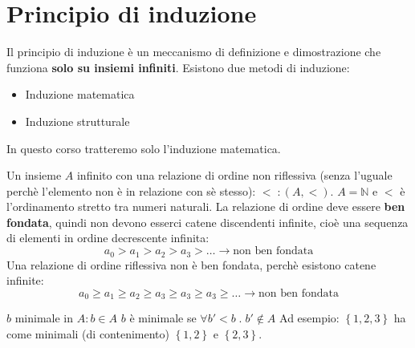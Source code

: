 \documentclass[a4paper]{article}
\begin{document}
\section{Principio di induzione}
Il principio di induzione è un meccanismo di definizione e dimostrazione che funziona
\textbf{solo su insiemi infiniti}. Esistono due metodi di induzione:
\begin{itemize}
  \item Induzione matematica
  \item Induzione strutturale
\end{itemize}
In questo corso tratteremo solo l'induzione matematica.

\vspace{1em}
\noindent
Un insieme \( A \) infinito con una relazione di ordine non riflessiva (senza l'uguale
perchè l'elemento non è in relazione con sè stesso): \( < \;: (A, <) \).
\( A = \mathbb{N} \) e \( < \) è l'ordinamento
stretto tra numeri naturali. La relazione di ordine deve essere \textbf{ben fondata},
quindi non devono esserci catene discendenti infinite, cioè una sequenza di elementi in
ordine decrescente infinita:
\[
  a_0 > a_1 > a_2 > a_3 > \ldots \to \text{non ben fondata}
\] 
Una relazione di ordine riflessiva non è ben fondata, perchè esistono catene
infinite:
\[
  a_0 \geq a_1 \geq a_2 \geq a_3 \geq a_3 \geq a_3 \geq \ldots \to \text{non ben fondata}
\]

\( b \) minimale in \( A : b \in A \) \( b \) è minimale se \( \forall b' < b \;.\; b' \notin A \) 
Ad esempio: \( \left\{ 1, 2, 3 \right\} \) ha come minimali (di contenimento) \( \left\{ 1, 2 \right\} \) 
e \( \left\{ 2,3 \right\} \).
\end{document}
